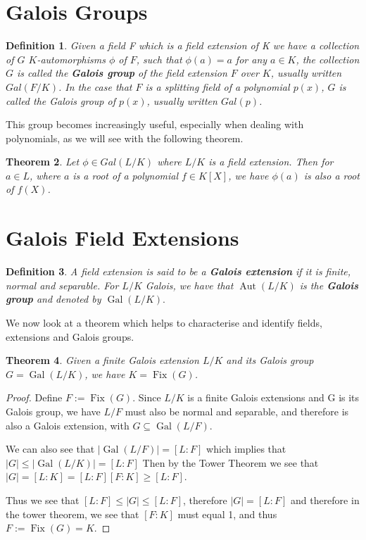 \documentclass[12pt]{article}
\newtheorem{theorem}{Theorem}
\newtheorem{definition}[theorem]{Definition}
\newcommand{\Gal}{\operatorname{Gal}}
\newcommand{\Aut}{\operatorname{Aut}}
\newcommand{\Fix}{\operatorname{Fix}}
\begin{document}
\section{Galois Groups}
\begin{definition}
    Given a field F which is a field extension of K we have a collection of \(G\) \(K\)-automorphisms $\phi$ of $F$, such that $\phi(a) = a $ for any $ a \in K$, the collection \(G\) is called the \textbf{Galois group} of the field extension \(F\) over \(K\), usually written \(Gal(F/K)\). In the case that \(F\) is a splitting field of a polynomial \(p(x)\), \(G\) is called the Galois group of \(p(x)\), usually written \(Gal(p)\).
\end{definition}

This group becomes increasingly useful, especially when dealing with polynomials, as we will see with the following theorem.

\begin{theorem} 
Let $\phi \in Gal(L/K)$ where $L/K$ is a field extension. Then for $a \in L$, where $a$ is a root of a polynomial $f \in K[X]$, we have $\phi(a)$ is also a root of $f(X)$.
\end{theorem}

\section{Galois Field Extensions}
\begin{definition}
A field extension is said to be a \textbf{Galois extension} if it is finite, normal and separable. For $L/K$ Galois, we have that $\Aut(L/K)$ is the \textbf{Galois group} and denoted by $\Gal(L/K).$
\end{definition}

\noindent We now look at a theorem which helps to characterise and identify fields, extensions and Galois groups.

\begin{theorem} \label{thm:fixed}
    Given a finite Galois extension $L/K$ and its Galois group $G=\Gal(L/K)$, we have $K = \Fix(G)$.
\end{theorem}

\begin{proof}
    Define $F:= \Fix(G)$. Since $L/K$ is a finite Galois extensions and G is its Galois group, we have $L/F$ must also be normal and separable, and therefore is also a Galois extension, with $G \subseteq \Gal(L/F)$.

\noindent We can also see that $|\Gal(L/F)| = [L:F]$ which implies that $|G|\leq|\Gal(L/K)|=[L:F]$
Then by the Tower Theorem we see that $|G|=[L:K]=[L:F][F:K]\geq [L:F]$.

Thus we see that $[L:F]\leq|G|\leq[L:F]$, therefore $|G|=[L:F]$ and therefore in the tower theorem, we see that $[F:K]$ must equal 1, and thus $F:=\Fix(G) = K$.
\end{proof}
\end{document}
